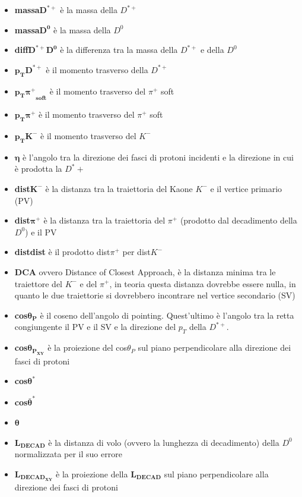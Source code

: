         \begin{itemize}
            \item \textbf{massa$\bm{D^{*+}}$} è la massa della $D^{*+}$
            \item \textbf{massa$\bm{D^0}$} è la massa della $D^0$
            \item \textbf{diff$\bm{D^{*+}D^0}$} è la differenza tra la massa della  $D^{*+}$ e della $D^0$
            \item \textbf{$\bm{p_TD^{*+}}$} è il momento trasverso della $D^{*+}$
            \item \textbf{$\bm{{p_T\pi^+}_{soft}}$} è il momento trasverso del $\pi^+$ soft
            \item \textbf{$\bm{p_T\pi^+}$} è il momento trasverso del $\pi^+$ soft 
            \item \textbf{$\bm{p_TK^-}$} è il momento trasverso del $K^-$
            \item \textbf{$\bm{\eta}$} è l'angolo tra la direzione dei fasci di protoni incidenti e la direzione in cui è prodotta la $D^*+$ %
            \item \textbf{dist$\bm{K^-}$} è la distanza tra la traiettoria del Kaone $K^-$ e il vertice primario (PV) %
            \item \textbf{dist$\bm{\pi^+}$} è la distanza tra la traiettoria del $\pi^+$ (prodotto dal decadimento della $D^0$) e il PV
            \item \textbf{distdist} è il prodotto dist$\pi^+$ per dist$K^-$
            \item \textbf{DCA} ovvero Distance of Closest Approach, è la distanza minima tra le traiettore del $K^-$ e del $\pi^+$, in teoria questa distanza dovrebbe essere nulla, in quanto le due traiettorie si dovrebbero incontrare nel vertice secondario (SV) %
            \item \textbf{cos$\bm{\theta_P}$} è il coseno dell'angolo di pointing. Quest'ultimo è l'angolo tra la retta congiungente il PV e il SV e la direzione del $p_T$ della $D^{*+}$.
             \item \textbf{cos$\bm{\theta_{P_{XY}}}$} è la proiezione del cos$\theta_P$ sul piano perpendicolare alla direzione dei fasci di protoni
            \item \textbf{cos$\bm{\theta^*}$} 
            \item \textbf{cos$\bm{\bar \theta^*}$}
            \item $\bm{\theta}$ 
            \item $\bm{L_{DECAD}}$ è la distanza di volo (ovvero la lunghezza di decadimento) della $D^0$ normalizzata per il suo errore 
             \item $\bm{L_{{DECAD}_{XY}}}$ è la proiezione della $\bm{L_{DECAD}}$ sul piano perpendicolare alla direzione dei fasci di protoni
        \end{itemize}{}
       
